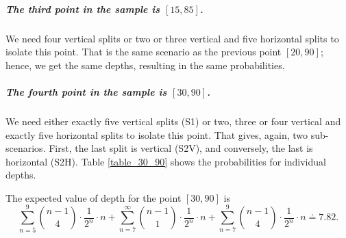 \subparagraph{The third point in the sample is $[15,85]$.} We need four vertical splits or two or three vertical and five horizontal splits to isolate this point. That is the same scenario as the previous point $[20,90]$; hence, we get the same depths, resulting in the same probabilities.

\subparagraph{The fourth point in the sample is $[30,90]$.} We need either exactly five vertical splits (S1) or two, three or four vertical and exactly five horizontal splits to isolate this point. That gives, again, two sub-scenarios. First, the last split is vertical (S2V), and conversely, the last is horizontal (S2H).
Table \ref{table_30_90} shows the probabilities for individual depths.



The expected value of depth for the point $[30,90]$ is
$$\sum_{n=5}^{9}\binom{n-1}{4}\cdot \frac{1}{2^n}\cdot n + \sum_{n=7}^{\infty}\binom{n-1}{1}\cdot \frac{1}{2^n}\cdot n + \sum_{n=7}^{9}\binom{n-1}{4}\cdot \frac{1}{2^n}\cdot n \doteq 7.82.$$




